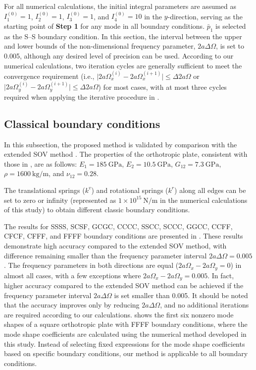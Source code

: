 \documentclass[preprint,12pt,number]{elsarticle}
\newcommand{\urho}{~\unit{\kilogram\per\meter}\xspace}
\newcommand{\ustif}{~\unit{\newton\per\metre}\xspace}
\newcommand{\nugpa}{~\si{\giga\pascal}\xspace}
\begin{document}
For all numerical calculations, the initial integral parameters are assumed as $I^{(0)}_1=1$, $I^{(0)}_2=1$, $I^{(0)}_3=1$, and $I^{(0)}_4=10$ in the $y$-direction, serving as the starting point of \textbf{Step 1} for any mode in all boundary conditions.  
$\bar{p}_1$ is selected as the S–S boundary condition.
In this section, the interval between the upper and lower bounds of the non-dimensional frequency parameter, $2a\Delta\Omega$, is set to 0.005, although any desired level of precision can be used.
According to our numerical calculations, two iteration cycles are generally sufficient to meet the convergence requirement (i.e., $\lvert 2a\Omega^{(i)}_{x} - 2a\Omega^{(i+1)}_{x} \rvert \leq \Delta 2a\Omega$ or $\lvert 2a\Omega^{(i)}_{y} - 2a\Omega^{(i+1)}_{y} \rvert \leq \Delta 2a\Omega$) for most cases, with at most three cycles required when applying the iterative procedure in .



\subsection{Classical boundary conditions}\label{sec:Classical boundary conditions}
In this subsection, the proposed method is validated by comparison with the extended SOV method \cite{xing2020extended}.  
The properties of the orthotropic plate, consistent with those in \cite{xing2020extended}, are as follows:  
$E_1 = 185 \nugpa$, $E_2 = 10.5 \nugpa$, $G_{12} = 7.3 \nugpa$, $\rho = 1600 \urho$, and $\nu_{12} = 0.28$.

The translational springs ($k^v$) and rotational springs ($k^r$) along all edges can be set to zero or infinity (represented as $1 \times 10^{15} \ustif$ in the numerical calculations of this study) to obtain different classic boundary conditions.  

The results for SSSS, SCSF, GCGC, CCCC, SSCC, SCCC, GGCC, CCFF, CFCF, CFFF, and FFFF boundary conditions are presented in . 
These results demonstrate high accuracy compared to the extended SOV method, with difference remaining smaller than the frequency parameter interval $2a\Delta\Omega=0.005$. 
The frequency parameters in both directions are equal ($2a\Omega_x - 2a\Omega_y = 0$) in almost all cases, with a few exceptions where $2a\Omega_x - 2a\Omega_y = 0.005$. 
In fact, higher accuracy compared to the extended SOV method can be achieved if the frequency parameter interval $2a\Delta\Omega$ is set smaller than 0.005. It should be noted that the accuracy improves only by reducing $2a\Delta\Omega$, and no additional iterations are required according to our calculations.
 shows the first six nonzero mode shapes of a square orthotropic plate with FFFF boundary conditions, where the mode shape coefficients are calculated using the numerical method developed in this study. 
Instead of selecting fixed expressions for the mode shape coefficients based on specific boundary conditions, our method is applicable to all boundary conditions.
\end{document}
